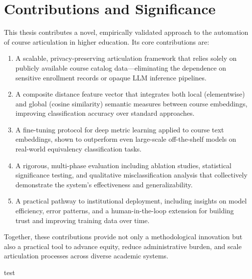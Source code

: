 \section{Contributions and Significance}
This thesis contributes a novel, empirically validated approach to the automation of course articulation in higher education. Its core contributions are:
\begin{enumerate}
    \item A scalable, privacy-preserving articulation framework that relies solely on publicly available course catalog data—eliminating the dependence on sensitive enrollment records or opaque LLM inference pipelines.
    \item A composite distance feature vector that integrates both local (elementwise) and global (cosine similarity) semantic measures between course embeddings, improving classification accuracy over standard approaches.
    \item A fine-tuning protocol for deep metric learning applied to course text embeddings, shown to outperform even large-scale off-the-shelf models on real-world equivalency classification tasks.
    \item A rigorous, multi-phase evaluation including ablation studies, statistical significance testing, and qualitative misclassification analysis that collectively demonstrate the system's effectiveness and generalizability.
    \item A practical pathway to institutional deployment, including insights on model efficiency, error patterns, and a human-in-the-loop extension for building trust and improving training data over time.
\end{enumerate}
Together, these contributions provide not only a methodological innovation but also a practical tool to advance equity, reduce administrative burden, and scale articulation processes across diverse academic systems.

test